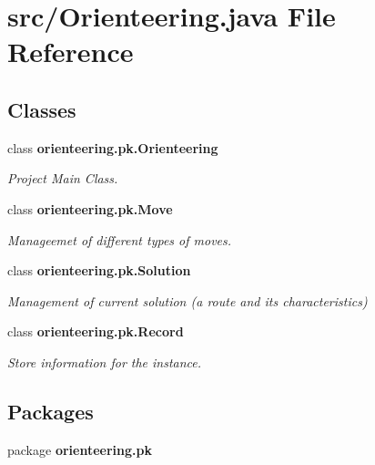 \section{src/\+Orienteering.java File Reference}
\label{Orienteering_8java}
\subsection*{Classes}
\begin{DoxyCompactItemize}
\item 
class \textbf{ orienteering.\+pk.\+Orienteering}
\begin{DoxyCompactList}\small\item\em Project Main Class. \end{DoxyCompactList}\item 
class {\bfseries orienteering.\+pk.\+Move}
\begin{DoxyCompactList}\small\item\em Manageemet of different types of moves. \end{DoxyCompactList}\item 
class {\bfseries orienteering.\+pk.\+Solution}
\begin{DoxyCompactList}\small\item\em Management of current solution (a route and its characteristics) \end{DoxyCompactList}\item 
class {\bfseries orienteering.\+pk.\+Record}
\begin{DoxyCompactList}\small\item\em Store information for the instance. \end{DoxyCompactList}\end{DoxyCompactItemize}
\subsection*{Packages}
\begin{DoxyCompactItemize}
\item 
package \textbf{ orienteering.\+pk}
\end{DoxyCompactItemize}
